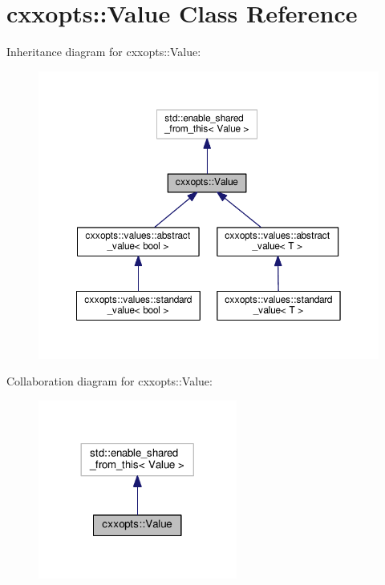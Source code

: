 \hypertarget{classcxxopts_1_1Value}{}\section{cxxopts\+:\+:Value Class Reference}
\label{classcxxopts_1_1Value}


Inheritance diagram for cxxopts\+:\+:Value\+:
\nopagebreak
\begin{figure}[H]
\begin{center}
\leavevmode
\includegraphics[width=350pt]{classcxxopts_1_1Value__inherit__graph}
\end{center}
\end{figure}


Collaboration diagram for cxxopts\+:\+:Value\+:
\nopagebreak
\begin{figure}[H]
\begin{center}
\leavevmode
\includegraphics[width=185pt]{classcxxopts_1_1Value__coll__graph}
\end{center}
\end{figure}
